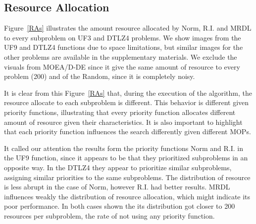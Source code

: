 






\subsection{Resource Allocation}



Figure~\ref{RAs} illustrates the amount resource allocated by Norm, R.I. and MRDL to every subproblem on UF3 and DTLZ4 problems. We show images from the UF9 and DTLZ4 functions due to space limitations, but similar images for the other problems are available in the supplementary materials. We exclude the visuals from MOEA/D-DE since it give the same amount of resource to every problem (200) and of the Random, since it is completely noisy.

It is clear from this Figure~\ref{RAs} that, during the execution of the algorithm, the resource allocate to each subproblem is different. This behavior is different given priority functions, illustrating that every priority function allocates different amount of resource given their characteristics. It is also important to highlight that each priority function influences the search differently given different MOPs.

It called our attention the results form the priority functions Norm and R.I. in the UF9 function, since it appears to be that they prioritized subproblems in an opposite way. In the DTLZ4 they appear to prioritize similar subproblems, assigning similar priorities to the same subproblems. The distribution of resource is less abrupt in the case of Norm, however R.I. had better results. MRDL influences weakly the distribution of resource allocation, which might indicate its poor performance. In both cases shown the its distribution got closer to 200 resources per subproblem, the rate of not using any priority function.





